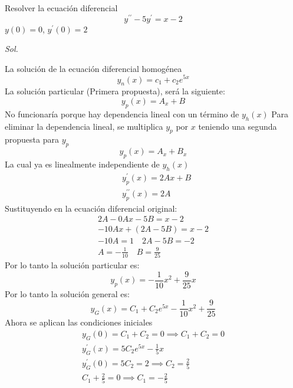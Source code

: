 \begin{example}
    Resolver la ecuación diferencial 
    \begin{equation*}
        y^{\prime\prime} - 5y^{\prime} = x - 2
    \end{equation*}
    $y(0)=0$, $y^{\prime}(0)=2$
\end{example}
\textit{ Sol. }

La solución de la ecuación diferencial homogénea
\begin{equation*}
    y_n(x) = c_1 +c_2 e^{5x}
\end{equation*}
La solución particular (Primera propuesta), será la siguiente:
\begin{equation*}
    y_p(x) = A_x+ B
\end{equation*}
No funcionaría porque hay dependencia lineal con un término de $y_h(x)$
Para eliminar la dependencia lineal, se multiplica $y_p$ por $x$ teniendo una segunda propuesta para $y_p$
\begin{equation*}
    y_p(x) = A_x + B_x
\end{equation*}
La cual ya es linealmente independiente de $y_h(x)$
\begin{align*}
    &y_p^{\prime}(x) = 2Ax + B\\
    &y_p^{\prime\prime}(x) = 2A
\end{align*}
Sustituyendo en la ecuación diferencial original:
\begin{align*}
    2A - 0Ax - 5B =x- 2\\
    - 10Ax +\left(2A - 5B\right) =x- 2\\
    -10A = 1\quad 2A - 5B =- 2\\
    A =-\frac{1}{10}\quad B =\frac{9}{25}
\end{align*}
Por lo tanto la solución particular es:
\begin{equation*}
    y_p(x) = -\frac{1}{10}x^2 + \frac{9}{25}x
\end{equation*}
Por lo tanto la solución general es:
\begin{equation*}
    y_G(x) =C_1 + C_2e^{5x} - \frac{1}{10}x^2 + \frac{9}{25}
\end{equation*}
Ahora se aplican las condiciones iniciales
\begin{align*}
    y_G(0) = C_1 + C_2 = 0\implies C_1 + C_2 = 0\\
    y^{\prime}_G(x) = 5C_2 e^{5x} - \frac{1}{5}x\\
    y^{\prime}_G(0) = 5C_2 =2\implies C_2 =\frac{2}{5}\\
    C_1+ \frac{2}{5} = 0\implies C_1 = -\frac{2}{5}
\end{align*}
